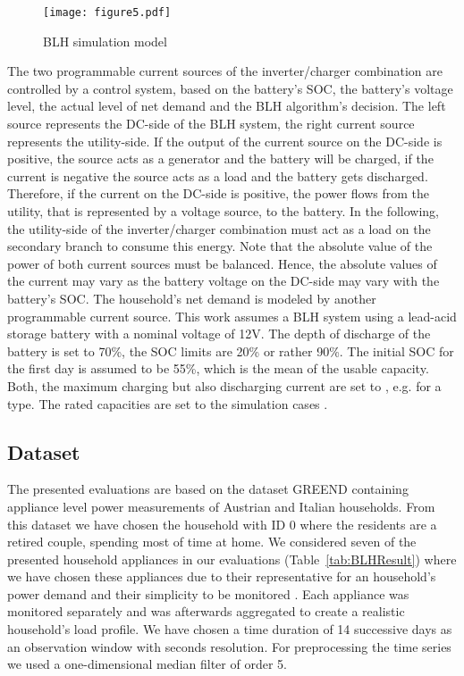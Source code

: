 \documentclass{article}
\begin{document}
\begin{figure}[h!]
	\centering
	\texttt{[image: figure5.pdf]}
	\caption{\ac{BLH} simulation model}
	\label{blh_simulation_model}
\end{figure}

The two programmable current sources of the inverter/charger combination are controlled by a control system, based on the battery's \ac{SOC}, the battery's voltage level, the actual level of net demand and the \ac{BLH} algorithm's decision. The left source represents the DC-side of the \ac{BLH} system, the right current source represents the utility-side. If the output of the current source on the DC-side is positive, the source acts as a generator and the battery will be charged, if the current is negative
the source acts as a load and the battery gets discharged. Therefore, if the current on the DC-side is positive, the power flows from the utility, that is represented by a voltage source, to the battery. In the following, the utility-side of the inverter/charger combination must act as a load on the secondary branch to consume this energy. Note that the absolute value of the power of both current sources must be balanced. Hence, the absolute values of the current may vary as the battery voltage on the DC-side may vary with the battery's \ac{SOC}. The household's net demand is modeled by another programmable current source.
This work assumes a \ac{BLH} system using a lead-acid storage battery with a nominal voltage of 12\:V. The depth of discharge of the battery is set to 70\%, the \ac{SOC} limits are 20\% or rather 90\%. The initial \ac{SOC} for the first day is assumed to be 55\%, which is the mean of the usable capacity. Both, the maximum charging but also discharging current are set to , e.g.  for a  type. The rated capacities are set to the simulation cases .
\subsection{Dataset}
The presented evaluations are based on the dataset \ac{GREEND} \cite{Andrea2014} containing appliance level power measurements of Austrian and Italian households. 
From this dataset we have chosen the household with ID 0 where the residents are a retired couple, spending most of time at home.
We considered seven of the presented household appliances in our evaluations (Table~\ref{tab:BLHResult}) where we have chosen these appliances due to their representative for an household's power demand and their simplicity to be monitored \cite{Carlson2013132}.
Each appliance was monitored separately and was afterwards aggregated to create a realistic household's load profile.
We have chosen a time duration of 14 successive days as an observation window with seconds resolution. 
For preprocessing the time series we used a one-dimensional median filter of order 5.
\end{document}
